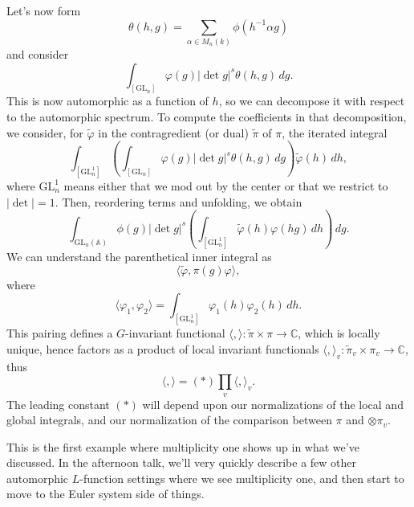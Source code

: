 \documentclass[reqno]{amsart} 
\numberwithin{theorem}{section}
\numberwithin{equation}{section}
\numberwithin{exercise}{section}
\begin{document}
Let's now form
\begin{equation*}
  \theta(h, g) = \sum_{\alpha \in M_n(k)} \phi(h^{-1} \alpha g)
\end{equation*}
and consider
\begin{equation*}
  \int_{[\mathrm{GL}_n]} \varphi(g) \lvert \det g \rvert^s \theta(h, g) \, d g.
\end{equation*}
This is now automorphic as a function of $h$, so we can decompose it with respect to the automorphic spectrum.  To compute the coefficients in that decomposition, we consider, for $\tilde{\varphi}$ in the contragredient (or dual) $\tilde{\pi}$ of $\pi$, the iterated integral
\begin{equation*}
  \int_{[\mathrm{GL}_n^1]}
  \left(  \int_{[\mathrm{GL}_n]} \varphi(g) \lvert \det g \rvert^s \theta(h, g) \, d g \right)
  \tilde{\varphi}(h) \, d h,
\end{equation*}
where $\mathrm{GL}_n^1$ means either that we mod out by the center or that we restrict to $\lvert \det \rvert = 1$.  Then, reordering terms and unfolding, we obtain
\begin{equation*}
  \int_{\mathrm{GL}_n(\mathbb{A})} \phi(g) \lvert \det g \rvert^s
  \left( \int_{[\mathrm{GL}_n^1]} \tilde{\varphi}(h)
    \varphi(h g) \,d h
  \right) \, d g.
\end{equation*}
We can understand the parenthetical inner integral as
\begin{equation*}
  \langle \tilde{\varphi}, \pi(g) \varphi \rangle,
\end{equation*}
where
\begin{equation*}
  \langle \varphi_1, \varphi_2 \rangle = \int_{[\mathrm{GL}_n^1]} \varphi_1(h) \varphi_2(h) \, d h.
\end{equation*}
This pairing defines a $G$-invariant functional $\langle , \rangle :  \tilde{\pi} \times \pi \rightarrow \mathbb{C}$, which is locally unique, hence factors as a product of local invariant functionals $\langle , \rangle_v : \tilde{\pi}_v \times \pi_v \rightarrow \mathbb{C}$, thus
\begin{equation*}
  \langle , \rangle =(\ast) \prod_v \langle , \rangle_v.
\end{equation*}
The leading constant $(\ast)$ will depend upon our normalizations of the local and global integrals, and our normalization of the comparison between $\pi$ and $\otimes \pi_v$.

This is the first example where multiplicity one shows up in what we've discussed.  In the afternoon talk, we'll very quickly describe a few other automorphic $L$-function settings where we see multiplicity one, and then start to move to the Euler system side of things.
\end{document}
